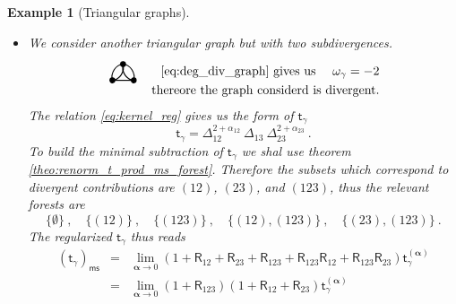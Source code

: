 \documentclass[11pt]{book}
\newcommand{\ms}{\mathsf{ms}}
\newcommand{\alphabd}{\boldsymbol{\alpha}}
\newcommand{\Rsf}{\mathsf{R}}
\newcommand{\tsf}{\mathsf{t}}
\theoremstyle{break}
\newtheorem{example}{Example}[chapter]
\newcommand{\FtwoGtwoHoneF}{\begin{tikzpicture}[thick,scale=1.5]
\useasboundingbox (-0.1,0.1) rectangle (0.5,0.4);
\filldraw (0,0) circle (1.3pt);
\filldraw (0.4,0) circle (1.3pt);
\filldraw (0.2,0.3) circle (1.3pt);
\draw (0,0) edge [out=105,in=185] node[above] {} (0.2,0.3);
\draw (0,0) edge [out=5,in=-75] node[above] {} (0.2,0.3);
\draw (0.4,0) edge [out=75,in=-5] node[above] {} (0.2,0.3);
\draw (0.4,0) edge [out=-185,in=-105] node[above] {} (0.2,0.3);
\draw (0.4,0) -- (0,0);
\end{tikzpicture} }
\begin{document}
\begin{example}[Triangular graphs]
\begin{itemize}
%
\par
%
In this particular case of the triangular graph with one fish graph as subgraph the subsets which correspond to divergent contributions are $(12)$ and $(123)$, therefore the relevant forests are 
%
\begin{equation*}
\{\emptyset\} \ , \quad \{(12)\} \ , \quad \{(123)\} \ , \quad \{(12),(123)\} \ .
\end{equation*} 
%
The regularized $\tsf_\gamma$ thus reads
\begin{eqnarray}
\left(\tsf_\gamma\right)_\ms &=& 
\lim_{\alphabd \to 0} \left(1+\Rsf_{12}+\Rsf_{123}+\Rsf_{123}\Rsf_{12}\right) \tsf^{(\alphabd)}_\gamma \nonumber \\
&=&\lim_{\alphabd \to 0} (1+\Rsf_{123})(1+\Rsf_{12}) \tsf^{(\alphabd)}_\gamma
\label{eq:kernel_trig_ms}
\end{eqnarray}
%
The regularization of $\tsf_\gamma$ \eqref{eq:kernel_trig_ms} is discussed in details in section \ref{p:COMPLICATED_GRAPH}. 
%
%
%
%
\item We consider another triangular graph but with two subdivergences.
%
\begin{eqnarray*}
\FtwoGtwoHoneF 
&& \mbox{\eqref{eq:deg_div_graph} gives us } \quad \omega_\gamma = -2 \\
&& \mbox{thereore the graph considerd is divergent.}
\end{eqnarray*}
%
The relation \eqref{eq:kernel_reg} gives us the form of $\tsf_\gamma$
%
\begin{equation*}
\tsf_\gamma = \Delta_{12}^{2+\alpha_{12}} \ \Delta_{13} \ \Delta_{23}^{2+\alpha_{23}} \ .
\end{equation*}
%
To build the minimal subtraction of $\tsf_\gamma$ we shal use theorem \ref{theo:renorm_t_prod_ms_forest}. Therefore the subsets which correspond to divergent contributions are $(12)$, $(23)$, and $(123)$, thus the relevant forests are 
%
\begin{equation*}
\{\emptyset\} \ , \quad \{(12)\} \ , \quad \{(123)\} \ , \quad \{(12),(123)\} \ , \quad \{(23),(123)\} \ .
\end{equation*} 
%
The regularized $\tsf_\gamma$ thus reads
\begin{eqnarray*}
\left(\tsf_\gamma\right)_\ms &=& \lim_{\alphabd \to 0}
\left(1
+ \Rsf_{12}
+ \Rsf_{23}
+ \Rsf_{123}
+ \Rsf_{123}\Rsf_{12}
+ \Rsf_{123}\Rsf_{23}
\right) \tsf^{(\alphabd)}_\gamma \\
&=& \lim_{\alphabd \to 0} (1+\Rsf_{123})(1+\Rsf_{12}+\Rsf_{23}) \tsf^{(\alphabd)}_\gamma
\end{eqnarray*}
%
\end{itemize}
%
\end{example}
\end{document}
